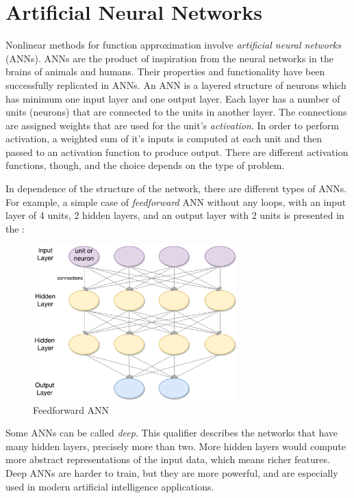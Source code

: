 \section{Artificial Neural Networks}\label{ANNsection}
Nonlinear methods for function approximation involve \textit{artificial neural networks} (ANNs). ANNs are the product of inspiration from the neural networks in the brains of animals and humans. Their properties and functionality have been successfully replicated in ANNs. An ANN is a layered structure of neurons which has minimum one input layer and one output layer. Each layer has a number of units (neurons) that are connected to the units in another layer. The connections are assigned weights that are used for the unit's \textit{activation}. In order to perform activation, a weighted sum of it's inputs is computed at each unit and then passed to an activation function to produce output. There are different activation functions, though, and the choice depends on the type of problem.

In dependence of the structure of the network, there are different types of ANNs. For example, a simple case of \textit{feedforward} ANN without any loops, with an input layer of 4 units, 2 hidden layers, and an output layer with 2 units is presented in the :
\begin{figure}[H]
	\centering
	\includegraphics[width=0.7\textwidth]{Figures/Feedforward}
	\caption{Feedforward ANN}
	\label{fig:feedforward}
\end{figure}
Some ANNs can be called \textit{deep}. This qualifier describes the networks that have many hidden layers, precisely more than two. More hidden layers would compute more abstract representations of the input data, which means richer features. Deep ANNs are harder to train, but they are more powerful, and are especially used in modern artificial intelligence applications.

